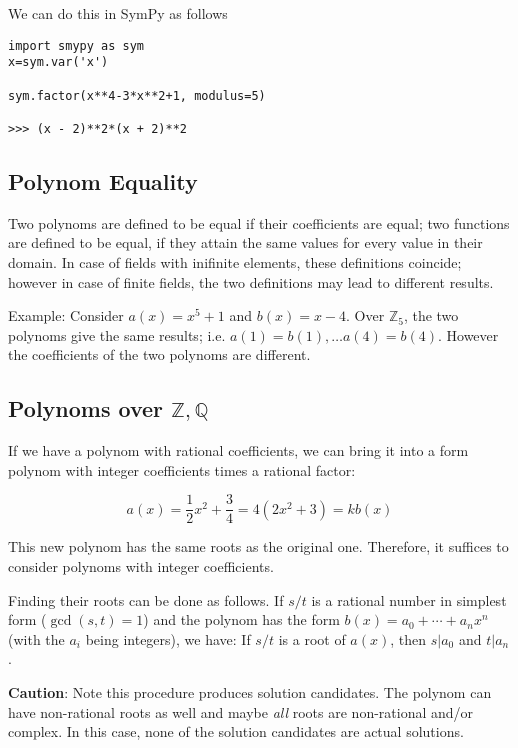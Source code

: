 We can do this in SymPy as follows

\begin{verbatim}
import smypy as sym
x=sym.var('x')

sym.factor(x**4-3*x**2+1, modulus=5)

>>> (x - 2)**2*(x + 2)**2
\end{verbatim}

\subsection{Polynom Equality}\label{polynom-equality}

Two polynoms are defined to be equal if their coefficients are equal;
two functions are defined to be equal, if they attain the same values
for every value in their domain. In case of fields with inifinite
elements, these definitions coincide; however in case of finite fields,
the two definitions may lead to different results.

Example: Consider \(a(x) = x^5 + 1\) and \(b(x) = x - 4\). Over
\(\mathbb{Z}_5\), the two polynoms give the same results; i.e.
\(a(1) = b(1), \ldots a(4) = b(4)\). However the coefficients of the two
polynoms are different.

\subsection{\texorpdfstring{Polynoms over
\(\mathbb{Z,Q}\)}{Polynoms over \textbackslash{}mathbb\{Z,Q\}}}\label{polynoms-over-mathbbzq}

If we have a polynom with rational coefficients, we can bring it into a
form polynom with integer coefficients times a rational factor:

\[
a(x) = \frac{1}{2} x^2 + \frac{3}{4} = 4 (2x^2 + 3) = k b(x)
\]

This new polynom has the same roots as the original one. Therefore, it
suffices to consider polynoms with integer coefficients.

Finding their roots can be done as follows. If \(s/t\) is a rational
number in simplest form (\(\gcd(s,t)=1\)) and the polynom has the form
\(b(x) = a_0 + \cdots + a_n x^n\) (with the \(a_i\) being integers), we
have: If \(s/t\) is a root of \(a(x)\), then \(s|a_0\) and \(t|a_n\).

\textbf{Caution}: Note this procedure produces solution candidates. The
polynom can have non-rational roots as well and maybe \emph{all} roots
are non-rational and/or complex. In this case, none of the solution
candidates are actual solutions.

